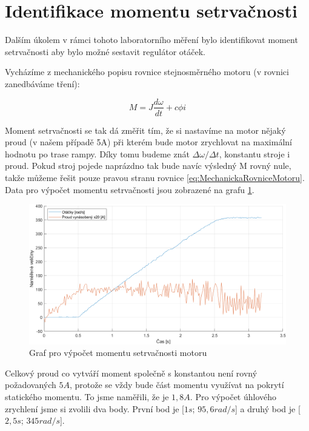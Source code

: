\documentclass{protokol}
\begin{document}
\section{Identifikace momentu setrvačnosti}

Dalším úkolem v rámci tohoto laboratorního měření bylo identifikovat moment setrvačnosti aby bylo možné sestavit regulátor otáček.

Vycházíme z mechanického popisu rovnice stejnosměrného motoru (v rovnici zanedbáváme tření):

\begin{equation}
    M = J\frac{d\omega}{dt}+c\phi{}i
    \label{eq:MechanickaRovniceMotoru}
\end{equation}

Moment setrvačnosti se tak dá změřit tím, že si nastavíme na motor nějaký proud (v našem případě 5A) při kterém bude motor zrychlovat na maximální hodnotu po trase rampy. Díky tomu budeme znát $\Delta{}\omega/\Delta{}t$, konstantu stroje i proud. Pokud stroj pojede naprázdno tak bude navíc výsledný M rovný nule, takže můžeme řešit pouze pravou stranu rovnice \ref{eq:MechanickaRovniceMotoru}. Data pro výpočet momentu setrvačnosti jsou zobrazené na grafu \ref{fig:VypocetMomentuSetrvacnostiMotoru}.

\begin{figure}[H]
    \centering
    \includegraphics[width=1\linewidth]{VypocetMomentuSetrvacnostiMotoru.png}
    \caption{Graf pro výpočet momentu setrvačnosti motoru}
    \label{fig:VypocetMomentuSetrvacnostiMotoru}
\end{figure}

Celkový proud co vytváří moment společně s konstantou není rovný požadovaných $5A$, protože se vždy bude část momentu využívat na pokrytí statického momentu. To jsme naměřili, že je $1,8A$. Pro výpočet úhlového zrychlení jsme si zvolili dva body. První bod je [$1s$; $95,6rad/s$] a druhý bod je [$2,5s$; $345rad/s$].
\end{document}
